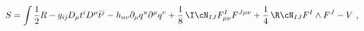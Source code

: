 \begin{equation}
  \label{agsg}
  S =  \int  \frac12 R - g_{i\bar\jmath} D_\mu t^i  D^\mu {\bar t}^j
- h_{uv} \partial_\mu q^u  \partial^\mu q^v
  + \frac{1}{8}\, \I \cN_{IJ} F^I_{\mu\nu} F^{J\mu\nu}
  + \frac{1}{4} \, \R \cN_{IJ} F^I \wedge F^J - V \ ,
\end{equation}

